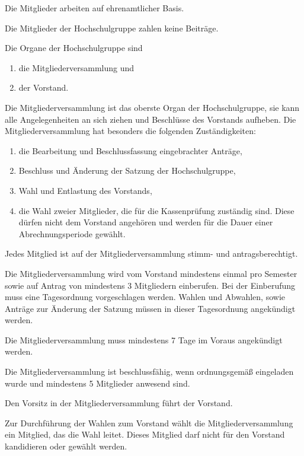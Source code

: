 \documentclass[a4paper, parskip=half, numbers=noenddot]{scrartcl}
\begin{document}
\begin{contract}
Die Mitglieder arbeiten auf ehrenamtlicher Basis.

Die Mitglieder der Hochschulgruppe zahlen keine Beiträge.

%
%


Die Organe der Hochschulgruppe sind

  \begin{enumerate}
  \item die Mitgliederversammlung und
  \item der Vorstand.
  \end{enumerate}


%
%

%

Die Mitgliederversammlung ist das oberste Organ der Hochschulgruppe,
sie kann alle Angelegenheiten an sich ziehen und Beschlüsse des Vorstands
aufheben. Die Mitgliederversammlung hat besonders die folgenden Zuständigkeiten:
\begin{enumerate}
  \item die Bearbeitung und Beschlussfassung eingebrachter Anträge,
  \item Beschluss und Änderung der Satzung der Hochschulgruppe,
  \item Wahl und Entlastung des Vorstands,
  \item die Wahl zweier Mitglieder, die für die Kassenprüfung zuständig sind.
    Diese dürfen nicht dem Vorstand angehören und werden für die Dauer einer
    Abrechnungsperiode gewählt.
\end{enumerate}

Jedes Mitglied ist auf der Mitgliederversammlung stimm- und antragsberechtigt.

Die Mitgliederversammlung wird vom Vorstand mindestens einmal pro Semester sowie
auf Antrag von mindestens 3 Mitgliedern einberufen.
Bei der Einberufung muss eine Tagesordnung vorgeschlagen werden.
Wahlen und Abwahlen, sowie Anträge zur Änderung der Satzung müssen in dieser
Tagesordnung angekündigt werden.

Die Mitgliederversammlung muss mindestens 7 Tage im Voraus angekündigt
werden.

Die Mitgliederversammlung ist beschlussfähig, wenn ordnungsgemäß eingeladen
wurde und mindestens 5 Mitglieder anwesend sind.

Den Vorsitz in der Mitgliederversammlung führt der Vorstand.

Zur Durchführung der Wahlen zum Vorstand wählt die Mitgliederversammlung ein
Mitglied, das die Wahl leitet.
Dieses Mitglied darf nicht für den Vorstand kandidieren oder gewählt werden.


\end{contract}
\end{document}
